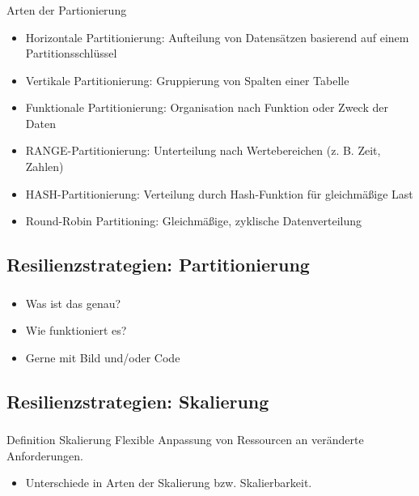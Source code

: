 \begin{frame}
    \frametitle{\insertsection}
    \framesubtitle{\insertsubsection}
    \begin{block}{Arten der Partionierung}
        \begin{itemize}
            \item Horizontale Partitionierung: Aufteilung von Datensätzen basierend auf einem Partitionsschlüssel
            \item Vertikale Partitionierung: Gruppierung von Spalten einer Tabelle
            \item Funktionale Partitionierung: Organisation nach Funktion oder Zweck der Daten
            \item RANGE-Partitionierung: Unterteilung nach Wertebereichen (z. B. Zeit, Zahlen)
            \item HASH-Partitionierung: Verteilung durch Hash-Funktion für gleichmäßige Last
            \item Round-Robin Partitioning: Gleichmäßige, zyklische Datenverteilung
        \end{itemize}
    \end{block}
\end{frame}

\subsection{Resilienzstrategien: Partitionierung}
\begin{frame}
    \frametitle{\insertsection}
    \framesubtitle{\insertsubsection}

    \begin{itemize}
        \item Was ist das genau?
        \item Wie funktioniert es?
        \item Gerne mit Bild und/oder Code %
    \end{itemize}
\end{frame}


\subsection{Resilienzstrategien: Skalierung}
\begin{frame}
    \frametitle{\insertsection}
    \framesubtitle{\insertsubsection}

    \begin{block}{Definition Skalierung}
Flexible Anpassung von Ressourcen an veränderte Anforderungen.\\
        \begin{itemize}
            \item Unterschiede in Arten der Skalierung bzw. Skalierbarkeit.
        \end{itemize}
    \end{block}
\end{frame}

